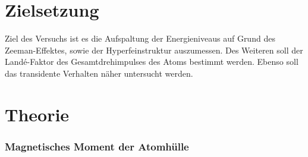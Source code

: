 \section{Zielsetzung}
\label{sec:Zielsetzung}
Ziel des Versuchs ist es die Aufspaltung der Energieniveaus auf Grund des Zeeman-Effektes,
sowie der Hyperfeinstruktur auszumessen. Des Weiteren soll der Landé-Faktor des Gesamtdrehimpulses
des Atoms bestimmt werden. Ebenso soll das transidente Verhalten näher untersucht
werden.

\section{Theorie}
\label{sec:Theorie}

\subsubsection{Magnetisches Moment der Atomhülle}
\label{sec:Atomhülle}




